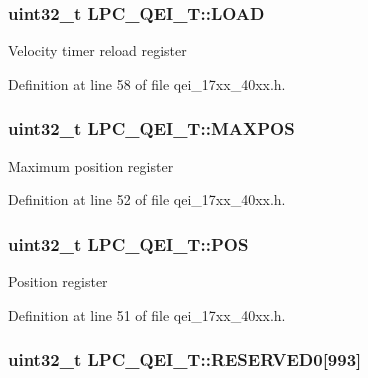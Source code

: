 \subsubsection[{\texorpdfstring{L\+O\+AD}{LOAD}}]{ uint32\+\_\+t L\+P\+C\+\_\+\+Q\+E\+I\+\_\+\+T\+::\+L\+O\+AD}\hypertarget{structLPC__QEI__T_aab13bc1fd1ecc6539d985d00a2beb756}{}\label{structLPC__QEI__T_aab13bc1fd1ecc6539d985d00a2beb756}
Velocity timer reload register 

Definition at line 58 of file qei\+\_\+17xx\+\_\+40xx.\+h.

\subsubsection[{\texorpdfstring{M\+A\+X\+P\+OS}{MAXPOS}}]{ uint32\+\_\+t L\+P\+C\+\_\+\+Q\+E\+I\+\_\+\+T\+::\+M\+A\+X\+P\+OS}\hypertarget{structLPC__QEI__T_acaf54ed95adb4553f8be314b509f786b}{}\label{structLPC__QEI__T_acaf54ed95adb4553f8be314b509f786b}
Maximum position register 

Definition at line 52 of file qei\+\_\+17xx\+\_\+40xx.\+h.

\subsubsection[{\texorpdfstring{P\+OS}{POS}}]{ uint32\+\_\+t L\+P\+C\+\_\+\+Q\+E\+I\+\_\+\+T\+::\+P\+OS}\hypertarget{structLPC__QEI__T_a400314449370eff087c3c5e1e1c31cc1}{}\label{structLPC__QEI__T_a400314449370eff087c3c5e1e1c31cc1}
Position register 

Definition at line 51 of file qei\+\_\+17xx\+\_\+40xx.\+h.

\subsubsection[{\texorpdfstring{R\+E\+S\+E\+R\+V\+E\+D0}{RESERVED0}}]{ uint32\+\_\+t L\+P\+C\+\_\+\+Q\+E\+I\+\_\+\+T\+::\+R\+E\+S\+E\+R\+V\+E\+D0\mbox{[}993\mbox{]}}\hypertarget{structLPC__QEI__T_a4989c1bc50afbce2d2b4e966d2c518a5}{}\label{structLPC__QEI__T_a4989c1bc50afbce2d2b4e966d2c518a5}


